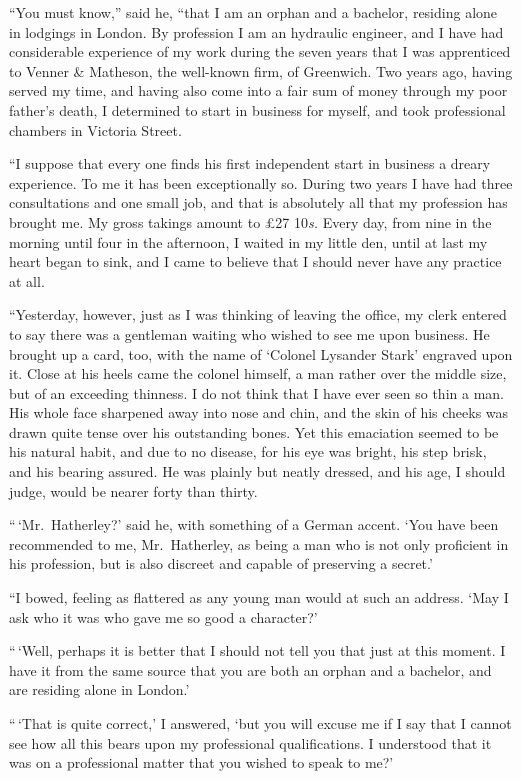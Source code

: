 “You must know,” said he, “that I am an orphan and a
bachelor, residing alone in lodgings in London. By profession
I am an hydraulic engineer, and I have had considerable
experience of my work during the seven years that I was
apprenticed to Venner \& Matheson, the well-known firm, of
Greenwich. Two years ago, having served my time, and having
also come into a fair sum of money through my poor
father’s death, I determined to start in business for myself,
and took professional chambers in Victoria Street.

“I suppose that every one finds his first independent start
in business a dreary experience. To me it has been exceptionally
so. During two years I have had three consultations
and one small job, and that is absolutely all that my profession
has brought me. My gross takings amount to £27 10\textit{s.}
Every day, from nine in the morning until four in the afternoon,
I waited in my little den, until at last my heart began
to sink, and I came to believe that I should never have any
practice at all.

“Yesterday, however, just as I was thinking of leaving the
office, my clerk entered to say there was a gentleman waiting
who wished to see me upon business. He brought up a card,
too, with the name of ‘Colonel Lysander Stark’ engraved
upon it. Close at his heels came the colonel himself, a man
rather over the middle size, but of an exceeding thinness. I
do not think that I have ever seen so thin a man. His whole
face sharpened away into nose and chin, and the skin of his
cheeks was drawn quite tense over his outstanding bones. Yet
this emaciation seemed to be his natural habit, and due to no
disease, for his eye was bright, his step brisk, and his bearing
assured. He was plainly but neatly dressed, and his age, I
should judge, would be nearer forty than thirty.

“\,‘Mr.~Hatherley?’ said he, with something of a German
accent. ‘You have been recommended to me, Mr.~Hatherley,
as being a man who is not only proficient in his profession,
but is also discreet and capable of preserving a secret.’

“I bowed, feeling as flattered as any young man would at
such an address. ‘May I ask who it was who gave me so
good a character?’

“\,‘Well, perhaps it is better that I should not tell you that
just at this moment. I have it from the same source that
you are both an orphan and a bachelor, and are residing
alone in London.’

“\,‘That is quite correct,’ I answered, ‘but you will excuse
me if I say that I cannot see how all this bears upon my
professional qualifications. I understood that it was on a
professional matter that you wished to speak to me?’

